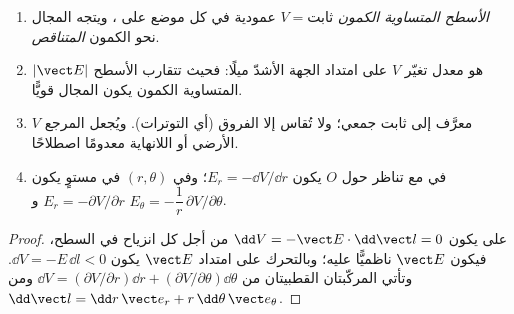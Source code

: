 \begin{proposition}\label{prop:b1:potential-capacitors:reading}
\begin{enumerate}
  \item \emph{الأسطح المتساوية الكمون} $V = \text{ثابت}$ عمودية
        في كل موضع على ، ويتجه المجال نحو
        الكمون \emph{المتناقص}.
  \item $|\vect E|$ هو معدل تغيّر $V$ على امتداد الجهة
        الأشدّ ميلًا: فحيث تتقارب الأسطح المتساوية الكمون يكون المجال قويًّا.
  \item $V$ معرَّف إلى ثابت جمعي؛ ولا تُقاس إلا الفروق
        (أي التوترات). ويُجعل المرجع الأرضي أو اللانهاية معدومًا
        اصطلاحًا.
  \item في  مع تناظر حول $O$ يكون $E_r = -\dd V/
        \dd r$؛ وفي  $(r, \theta)$ في مستوٍ يكون
        $E_r = -\partial V/\partial r$ و $E_\theta = -\dfrac1r\,\partial V/\partial\theta$.
\end{enumerate}
\end{proposition}

\begin{proof}
على  يكون $\dd V = -\vect E\cdot\dd\vect l = 0$ من أجل كل
انزياح في السطح، فيكون $\vect E$ ناظميًّا عليه؛ وبالتحرك على امتداد
$\vect E$ يكون $\dd V = -E\,\dd l < 0$. وتأتي المركّبتان القطبيتان من
$\dd V = (\partial V/\partial r)\dd r + (\partial V/\partial\theta)\dd\theta$ ومن
$\dd\vect l = \dd r\,\vect e_r + r\,\dd\theta\,\vect e_\theta$.
\end{proof}

